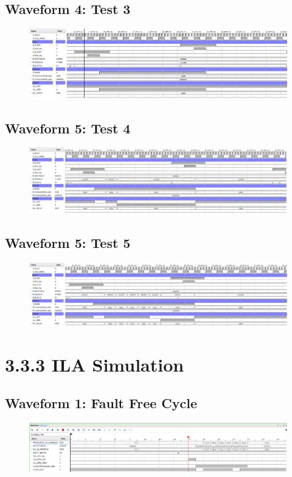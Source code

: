 \documentclass[11pt]{report}
\begin{document}
\subsection*{Waveform 4: Test 3}
\begin{figure}[H]
    \includegraphics[width=\columnwidth]{Assets/3.3.2_test3.png}
\end{figure}

\subsection*{Waveform 5: Test 4}
\begin{figure}[H]
    \includegraphics[width=\columnwidth]{Assets/3.3.2_test4.png}
\end{figure}

\subsection*{Waveform 5: Test 5}
\begin{figure}[H]
    \includegraphics[width=\columnwidth]{Assets/3.3.2_test5.png}
\end{figure}


\section*{3.3.3 ILA Simulation}
\subsection*{Waveform 1: Fault Free Cycle}
\begin{figure}[H]
    \includegraphics[width=\columnwidth]{Assets/3.3.3_fault-free.png}
\end{figure}
\end{document}
